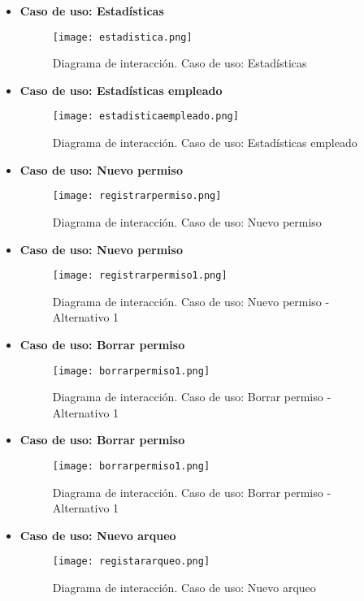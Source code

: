 \begin{itemize}
\item \textbf{Caso de uso: Estadísticas}
\begin{figure}[!htb]
  \centering
    \texttt{[image: estadistica.png]}
  \caption{Diagrama de interacción. Caso de uso: Estadísticas}
  \label{a}
\end{figure}

\newpage
\item \textbf{Caso de uso: Estadísticas empleado}
\begin{figure}[!htb]
  \centering
    \texttt{[image: estadisticaempleado.png]}
  \caption{Diagrama de interacción. Caso de uso: Estadísticas empleado}
  \label{a}
\end{figure}

\item \textbf{Caso de uso: Nuevo permiso}
\begin{figure}[!htb]
  \centering
    \texttt{[image: registrarpermiso.png]}
  \caption{Diagrama de interacción. Caso de uso: Nuevo permiso}
  \label{a}
\end{figure}

\newpage
\item \textbf{Caso de uso: Nuevo permiso}
\begin{figure}[!htb]
  \centering
    \texttt{[image: registrarpermiso1.png]}
  \caption{Diagrama de interacción. Caso de uso: Nuevo permiso - Alternativo 1}
  \label{a}
\end{figure}

\item \textbf{Caso de uso: Borrar permiso}
\begin{figure}[!htb]
  \centering
    \texttt{[image: borrarpermiso1.png]}
  \caption{Diagrama de interacción. Caso de uso: Borrar permiso - Alternativo 1}
  \label{a}
\end{figure}

\newpage
\item \textbf{Caso de uso: Borrar permiso}
\begin{figure}[!htb]
  \centering
    \texttt{[image: borrarpermiso1.png]}
  \caption{Diagrama de interacción. Caso de uso: Borrar permiso - Alternativo 1}
  \label{a}
\end{figure}

\item \textbf{Caso de uso: Nuevo arqueo}
\begin{figure}[!htb]
  \centering
    \texttt{[image: registararqueo.png]}
  \caption{Diagrama de interacción. Caso de uso: Nuevo arqueo}
  \label{a}
\end{figure}


\end{itemize}
